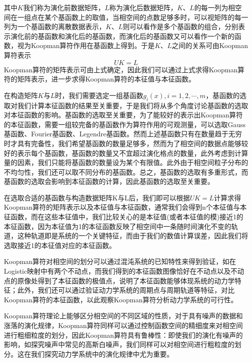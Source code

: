 其中$K$我们称为演化前数据矩阵，$L$称为演化后数据矩阵，$K$、$L$的每一列为相空间在一组点在某个基函数上的取值，当相空间的点数足够多时，可以视矩阵的每一列为一个基函数的离散数据表示，$K$、$L$则可以看作是多个基函数的组合，分别表示演化前的基函数和演化后的基函数，而演化后的基函数又可以看作一个新的函数，视为Koopman算符作用在基函数上得到。于是$K$、$L$之间的关系可由Koopman算符表示
\begin{equation}
    UK=L
    \label{eq:Koop_kl1}
\end{equation}
Koopman算符的矩阵表示可由上式确定，因此我们可以通过上式求得Koopman算符的矩阵表示，进一步求得Koopman算符的本征值与本征函数。

在构造矩阵$K$与$L$时，我们需要选定一组基函数${g_i(x)},i=1,2,\cdots,m$，基函数的选取对我们计算本征函数的结果至关重要，于是我们将从多个角度讨论基函数的选取对本征函数的影响。基函数的选取至关重要，为了能较好的表示出Koopman算符的本征函数，需要一组较完备的基函数作为算符作用的可观测量，可以选取Gauss基函数、Fourier基函数、Legendre基函数。然而上述基函数只有在数量趋于无穷时才具有完备性，我们希望基函数的数量足够多，然而为了相空间的数据点能够较好的表示每个基函数，基函数的数量又不宜超过演化格点的数量，此外考虑到计算量的因素，我们只能将基函数的数量设为某个有限值。此外由于相空间粒子分布的不均匀性，我们还可以取不同分布的基函数。总之，基函数的选取有多重形式，而基函数的选取会影响到本征函数的计算，因此基函数的选取至关重要。

在选取合适的基函数与构造数据矩阵K与L后，我们即可以根据$UK=L$计算求得Koopman算符的矩阵表示以及本征值与本征函数，通常我们会得到n个本征值与本征函数，而在这些本征值中，我们比较关心的是本征值(或者本征值的模)接近1的本征函数，因为本征值为1的本征函数反映了相空间中一条随时间演化不变的轨道，这种轨道即是系统的一个关键特征，而由于我们的数值计算误差，因此我们将选取接近1的本征值对应的本征函数。

Koopman算符对相空间的划分可以通过混沌系统的已知特性来得到验证，如在Logistic映射中有两个不动点，而我们得到的本征函数图像恰好在不动点以及不动点的原像处得到了本征函数的极值点，说明了本征函数能够体现系统的动力学特征；此外，我们还可以通过验证动力学系统的周期点与周期轨道等特征，对比Koopman算符的本征函数，以此观察Koopman算符分析动力学系统的可行性。

Koopman算符理论上能够区分相空间的不同区域的性质，对于具有噪声的数据和涨落的演化规律，Koopman算符同样可以通过控制函数空间的精细度来对相空间进行粗细粒度的划分，因此Koopman算符具有鲁棒性：即使我们的演化有噪声的影响，如探究噪声中常见的高斯白噪声，我们同样可以对相空间进行粗粒度的划分。这在我们探究动力学系统中的演化规律中尤为重要。

